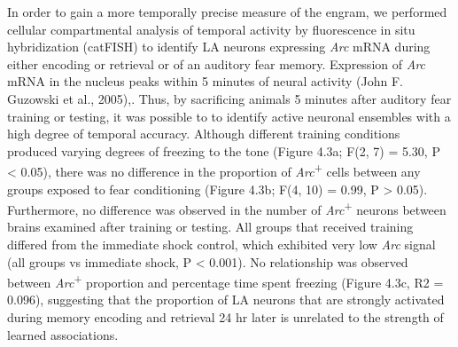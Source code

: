 \documentclass[12pt,a4paper,]{report}
\begin{document}
In order to gain a more temporally precise measure of the engram, we
performed cellular compartmental analysis of temporal activity by
fluorescence in situ hybridization (catFISH) to identify LA neurons
expressing \emph{Arc} mRNA during either encoding or retrieval or of an
auditory fear memory. Expression of \emph{Arc} mRNA in the nucleus peaks
within 5 minutes of neural activity (John F. Guzowski et al., 2005),.
Thus, by sacrificing animals 5 minutes after auditory fear training or
testing, it was possible to to identify active neuronal ensembles with a
high degree of temporal accuracy. Although different training conditions
produced varying degrees of freezing to the tone (Figure 4.3a; F(2, 7) =
5.30, P \textless{} 0.05), there was no difference in the proportion of
\emph{Arc}\textsuperscript{+} cells between any groups exposed to fear
conditioning (Figure 4.3b; F(4, 10) = 0.99, P \textgreater{} 0.05).
Furthermore, no difference was observed in the number of
\emph{Arc}\textsuperscript{+} neurons between brains examined after
training or testing. All groups that received training differed from the
immediate shock control, which exhibited very low \emph{Arc} signal (all
groups vs immediate shock, P \textless{} 0.001). No relationship was
observed between \emph{Arc}\textsuperscript{+} proportion and percentage
time spent freezing (Figure 4.3c, R2 = 0.096), suggesting that the
proportion of LA neurons that are strongly activated during memory
encoding and retrieval 24 hr later is unrelated to the strength of
learned associations.
\end{document}
